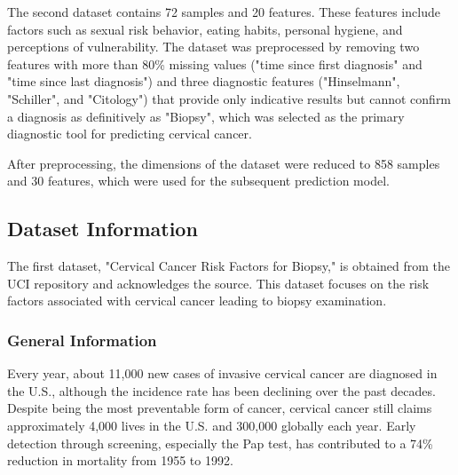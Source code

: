 \documentclass{llncs}
\begin{document}
The second dataset contains 72 samples and 20 features. These features include factors such as sexual risk behavior, eating habits, personal hygiene, and perceptions of vulnerability. The dataset was preprocessed by removing two features with more than 80\% missing values ("time since first diagnosis" and "time since last diagnosis") and three diagnostic features ("Hinselmann", "Schiller", and "Citology") that provide only indicative results but cannot confirm a diagnosis as definitively as "Biopsy", which was selected as the primary diagnostic tool for predicting cervical cancer. 

After preprocessing, the dimensions of the dataset were reduced to 858 samples and 30 features, which were used for the subsequent prediction model.

\subsection{Dataset Information}
The first dataset, "Cervical Cancer Risk Factors for Biopsy," is obtained from the UCI repository and acknowledges the source. This dataset focuses on the risk factors associated with cervical cancer leading to biopsy examination.

\subsubsection{General Information}
Every year, about 11,000 new cases of invasive cervical cancer are diagnosed in the U.S., although the incidence rate has been declining over the past decades. Despite being the most preventable form of cancer, cervical cancer still claims approximately 4,000 lives in the U.S. and 300,000 globally each year. Early detection through screening, especially the Pap test, has contributed to a 74\% reduction in mortality from 1955 to 1992.
\end{document}
